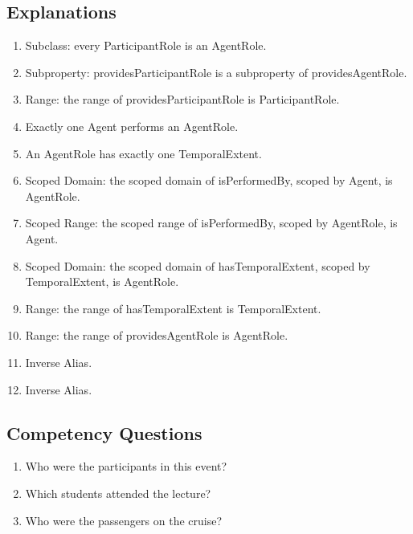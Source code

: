 \subsection{Explanations}
\label{exp:ParticipantRole}
\begin{enumerate}
\item Subclass: every \textsf{ParticipantRole} is an \textsf{AgentRole}.
\item Subproperty: \textsf{providesParticipantRole} is a subproperty of \textsf{providesAgentRole}.
\item Range: the range of \textsf{providesParticipantRole} is \textsf{ParticipantRole}.
\item Exactly one \textsf{Agent} performs an \textsf{AgentRole}.
\item An \textsf{AgentRole} has exactly one \textsf{TemporalExtent}.
\item Scoped Domain: the scoped domain of \textsf{isPerformedBy}, scoped by \textsf{Agent}, is \textsf{AgentRole}.
\item Scoped Range: the scoped range of \textsf{isPerformedBy}, scoped by \textsf{AgentRole}, is \textsf{Agent}. 
\item Scoped Domain: the scoped domain of \textsf{hasTemporalExtent}, scoped by \textsf{TemporalExtent}, is \textsf{AgentRole}.
\item Range: the range of \textsf{hasTemporalExtent} is \textsf{TemporalExtent}.
\item Range:  the range of \textsf{providesAgentRole} is \textsf{AgentRole}.
\item Inverse Alias.
\item Inverse Alias.
\end{enumerate}

\subsection{Competency Questions}
\label{cqs:ParticipantRole}
\begin{enumerate}[CQ1.]
\item Who were the participants in this event?
\item Which students attended the lecture?
\item Who were the passengers on the cruise?
\end{enumerate}

\newpage
